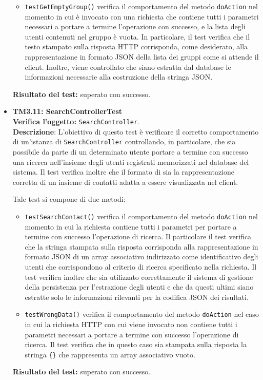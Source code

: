 \begin{itemize}
\begin{itemize}
\item \texttt{testGetEmptyGroup()} verifica il comportamento del metodo \texttt{doAction} nel momento in cui è invocato con una richiesta che contiene tutti i parametri necessari a portare a termine l'operazione con successo, e la lista degli utenti contenuti nel gruppo è vuota. In particolare, il test verifica che il testo stampato sulla risposta HTTP corrisponda, come desiderato, alla rappresentazione in formato JSON della lista dei gruppi come si attende il client. Inoltre, viene controllato che siano estratta dal database le informazioni necessarie alla costruzione della stringa JSON.
\end{itemize}
\textbf{Risultato del test:} superato con successo.


\item \textbf{TM3.11: SearchControllerTest}\\
\textbf{Verifica l'oggetto:} \texttt{SearchController}.\\
\textbf{Descrizione}: L'obiettivo di questo test è verificare il corretto comportamento di un'istanza di \texttt{SearchController} controllando, in particolare, che sia possibile da parte di un determinato utente portare a termine con successo una ricerca nell'insieme degli utenti registrati memorizzati nel database del sistema. Il test verifica inoltre che il formato di  sia la rappresentazione corretta di un insieme di contatti adatta a essere visualizzata nel client.

Tale test si compone di due metodi:
\begin{itemize}

\item \texttt{testSearchContact()} verifica il comportamento del metodo \texttt{doAction} nel momento in cui la richiesta contiene tutti i parametri per portare a termine con successo l'operazione di ricerca. Il particolare il test verifica che la stringa stampata sulla risposta corrisponda alla rappresentazione in formato JSON di un array associativo indirizzato come identificativo degli utenti che corrispondono al criterio di ricerca specificato nella richiesta. Il test verifica inoltre che sia utilizzato correttamente il sistema di gestione della persistenza per l'estrazione degli utenti e che da questi ultimi siano estratte solo le informazioni rilevanti per la codifica JSON dei risultati.

\item \texttt{testWrongData()} verifica il comportamento del metodo \texttt{doAction} nel caso in cui la richiesta HTTP con cui viene invocato non contiene tutti i parametri necessari a portare a termine con successo l'operazione di ricerca. Il test verifica che in questo caso sia stampata sulla risposta la stringa \texttt{\{\}} che rappresenta un array associativo vuoto.
\end{itemize}
\textbf{Risultato del test:} superato con successo.



\end{itemize}
